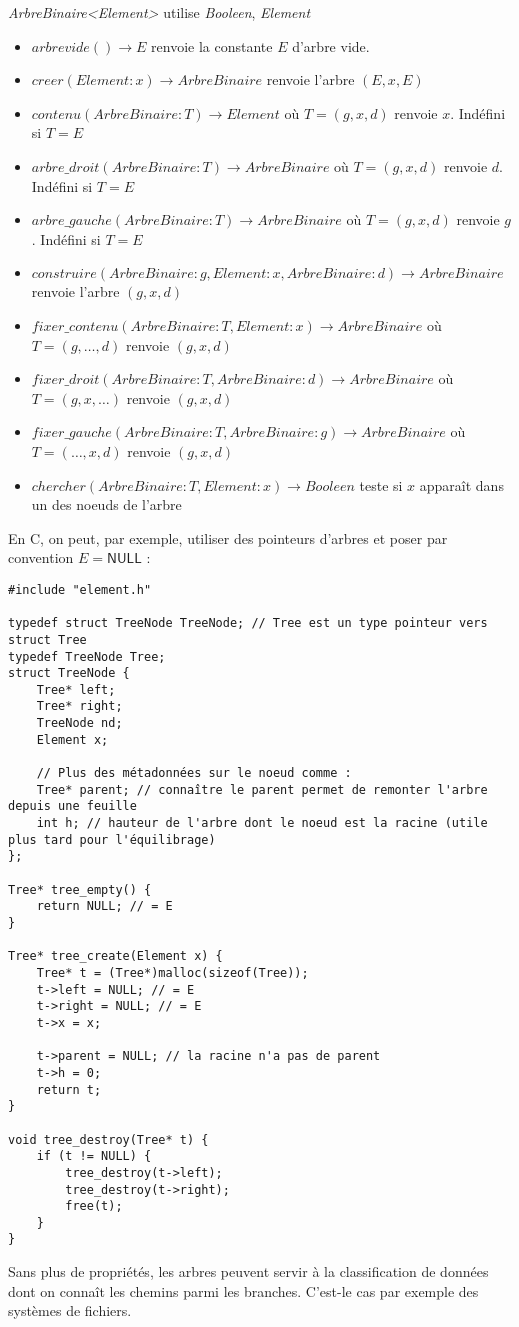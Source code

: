 \documentclass[../../../main.tex]{subfiles}
\begin{document}
\textit{ArbreBinaire\textless{}Element\textgreater} utilise \textit{Booleen}, \textit{Element}
\begin{itemize}
	\item $arbrevide()\rightarrow E$ renvoie la constante $E$ d'arbre vide.
	\item $creer(Element:x) \rightarrow ArbreBinaire$ renvoie l'arbre $(E, x, E)$
	\item $contenu(ArbreBinaire:T)\rightarrow Element$ où $T = (g, x, d)$ renvoie $x$. Indéfini si $T = E$
	\item $arbre\_droit(ArbreBinaire:T)\rightarrow ArbreBinaire$ où $T = (g, x, d)$ renvoie $d$. Indéfini si $T = E$
	\item $arbre\_gauche(ArbreBinaire:T)\rightarrow ArbreBinaire$ où $T = (g, x, d)$ renvoie $g$. Indéfini si $T = E$
	\item $construire(ArbreBinaire:g, Element:x, ArbreBinaire:d)\rightarrow ArbreBinaire$ renvoie l'arbre $(g, x, d)$
	\item $fixer\_contenu(ArbreBinaire:T, Element:x)\rightarrow ArbreBinaire$ où $T = (g, \dots, d)$ renvoie $(g, x, d)$
	\item $fixer\_droit(ArbreBinaire:T, ArbreBinaire:d)\rightarrow ArbreBinaire$ où $T = (g, x, \dots)$ renvoie $(g, x, d)$
	\item $fixer\_gauche(ArbreBinaire:T, ArbreBinaire:g)\rightarrow ArbreBinaire$ où $T = (\dots, x, d)$ renvoie $(g, x, d)$
	\item $chercher(ArbreBinaire:T, Element:x)\rightarrow Booleen$ teste si $x$ apparaît dans un des noeuds de l'arbre
\end{itemize}
En C, on peut, par exemple, utiliser des pointeurs d'arbres et poser par convention $E = \textsf{NULL}$ :
\begin{verbatim}
#include "element.h"

typedef struct TreeNode TreeNode; // Tree est un type pointeur vers struct Tree
typedef TreeNode Tree;
struct TreeNode {
	Tree* left;
	Tree* right;
	TreeNode nd;
	Element x;

	// Plus des métadonnées sur le noeud comme :
	Tree* parent; // connaître le parent permet de remonter l'arbre depuis une feuille
	int h; // hauteur de l'arbre dont le noeud est la racine (utile plus tard pour l'équilibrage)
};

Tree* tree_empty() {
	return NULL; // = E
}

Tree* tree_create(Element x) {
	Tree* t = (Tree*)malloc(sizeof(Tree));
	t->left = NULL; // = E
	t->right = NULL; // = E
	t->x = x;

	t->parent = NULL; // la racine n'a pas de parent
	t->h = 0;
	return t;
}

void tree_destroy(Tree* t) {
	if (t != NULL) {
		tree_destroy(t->left);
		tree_destroy(t->right);
		free(t);
	}
}
\end{verbatim}
Sans plus de propriétés, les arbres peuvent servir à la classification de données dont on connaît les chemins parmi les branches. C'est-le cas par exemple des systèmes de fichiers.
\end{document}
